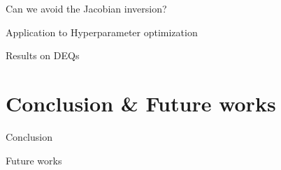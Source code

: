 \documentclass[aspectratio=169,xcolor=dvipsnames]{beamer}
\begin{document}
\begin{frame}{Can we avoid the Jacobian inversion?}
\end{frame}

\begin{frame}{Application to Hyperparameter optimization}
\end{frame}

\begin{frame}{Results on DEQs}

\end{frame}

\section{Conclusion \& Future works}

\begin{frame}{Conclusion}
\end{frame}

\begin{frame}{Future works}
\end{frame}
\end{document}
